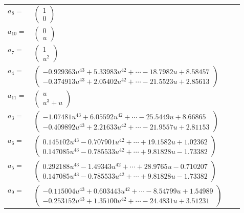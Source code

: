 \documentclass[1p]{elsarticle_modified}
\theoremstyle{definition}
\begin{document}
\begin{tabular}{m{7pt} m{180pt} m{7pt} m{180pt} }
\flushright $a_{8}=$&$\begin{pmatrix}1\\0\end{pmatrix}$ \\
\flushright $a_{10}=$&$\begin{pmatrix}0\\u\end{pmatrix}$ \\
\flushright $a_{7}=$&$\begin{pmatrix}1\\u^2\end{pmatrix}$ \\
\flushright $a_{4}=$&$\begin{pmatrix}-0.929363 u^{43}+5.33983 u^{42}+\cdots-18.7982 u+8.58457\\-0.374913 u^{43}+2.05402 u^{42}+\cdots-21.5523 u+2.85613\end{pmatrix}$ \\
\flushright $a_{11}=$&$\begin{pmatrix}u\\u^3+u\end{pmatrix}$ \\
\flushright $a_{3}=$&$\begin{pmatrix}-1.07481 u^{43}+6.05592 u^{42}+\cdots-25.5449 u+8.66865\\-0.409892 u^{43}+2.21633 u^{42}+\cdots-21.9557 u+2.81153\end{pmatrix}$ \\
\flushright $a_{6}=$&$\begin{pmatrix}0.145102 u^{43}-0.707901 u^{42}+\cdots+19.1582 u+1.02362\\0.147085 u^{43}-0.785533 u^{42}+\cdots+9.81828 u-1.73382\end{pmatrix}$ \\
\flushright $a_{5}=$&$\begin{pmatrix}0.292188 u^{43}-1.49343 u^{42}+\cdots+28.9765 u-0.710207\\0.147085 u^{43}-0.785533 u^{42}+\cdots+9.81828 u-1.73382\end{pmatrix}$ \\
\flushright $a_{9}=$&$\begin{pmatrix}-0.115004 u^{43}+0.603443 u^{42}+\cdots-8.54799 u+1.54989\\-0.253152 u^{43}+1.35100 u^{42}+\cdots-24.4831 u+3.51231\end{pmatrix}$ \\

\end{tabular}
\end{document}
